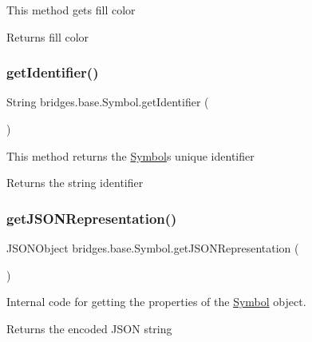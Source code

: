 This method gets fill color

\begin{DoxyReturn}{Returns}
fill color 
\end{DoxyReturn}
\mbox{\label{classbridges_1_1base_1_1_symbol_a53cea862b06ffc230ca68d4d34c8820d}} 
\subsubsection{\texorpdfstring{get\+Identifier()}{getIdentifier()}}
{\footnotesize\ttfamily String bridges.\+base.\+Symbol.\+get\+Identifier (\begin{DoxyParamCaption}{ }\end{DoxyParamCaption})}

This method returns the \mbox{\hyperlink{classbridges_1_1base_1_1_symbol}{Symbol}}\textquotesingle{}s unique identifier \begin{DoxyReturn}{Returns}
the string identifier 
\end{DoxyReturn}
\mbox{\label{classbridges_1_1base_1_1_symbol_aeba4cfa5b39fe03e72a568a8b7452e60}} 
\subsubsection{\texorpdfstring{get\+J\+S\+O\+N\+Representation()}{getJSONRepresentation()}}
{\footnotesize\ttfamily J\+S\+O\+N\+Object bridges.\+base.\+Symbol.\+get\+J\+S\+O\+N\+Representation (\begin{DoxyParamCaption}{ }\end{DoxyParamCaption})}

Internal code for getting the properties of the \mbox{\hyperlink{classbridges_1_1base_1_1_symbol}{Symbol}} object. \begin{DoxyReturn}{Returns}
the encoded J\+S\+ON string 
\end{DoxyReturn}
\mbox{\label{classbridges_1_1base_1_1_symbol_a7616c25b288a6e464f4f0b5fe4bd2826}} 
